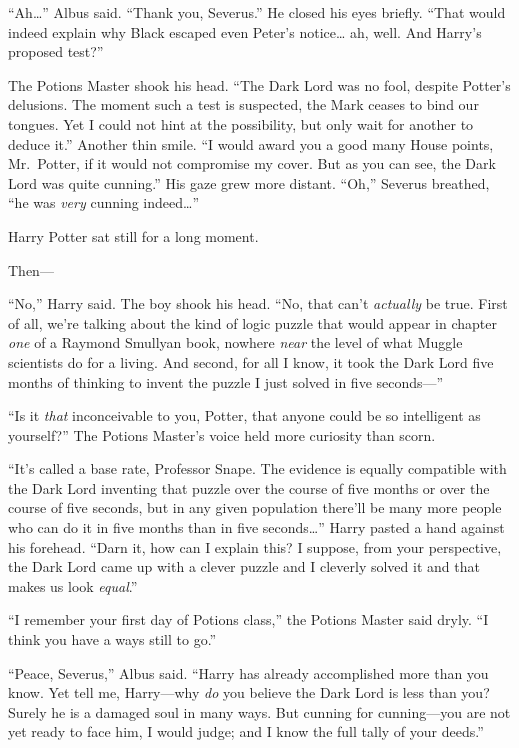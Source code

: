 ``Ah\ldots{}'' Albus said. ``Thank you, Severus.'' He closed his eyes
briefly. ``That would indeed explain why Black escaped even Peter's
notice\ldots{} ah, well. And Harry's proposed test?''

The Potions Master shook his head. ``The Dark Lord was no fool, despite
Potter's delusions. The moment such a test is suspected, the Mark ceases
to bind our tongues. Yet I could not hint at the possibility, but only
wait for another to deduce it.'' Another thin smile. ``I would award you
a good many House points, Mr.~Potter, if it would not compromise my
cover. But as you can see, the Dark Lord was quite cunning.'' His gaze
grew more distant. ``Oh,'' Severus breathed, ``he was \emph{very}
cunning indeed\ldots{}''

Harry Potter sat still for a long moment.

Then---

``No,'' Harry said. The boy shook his head. ``No, that can't
\emph{actually} be true. First of all, we're talking about the kind of
logic puzzle that would appear in chapter \emph{one} of a Raymond
Smullyan book, nowhere \emph{near} the level of what Muggle scientists
do for a living. And second, for all I know, it took the Dark Lord five
months of thinking to invent the puzzle I just solved in five
seconds---''

``Is it \emph{that} inconceivable to you, Potter, that anyone could be
so intelligent as yourself?'' The Potions Master's voice held more
curiosity than scorn.

``It's called a base rate, Professor Snape. The evidence is equally
compatible with the Dark Lord inventing that puzzle over the course of
five months or over the course of five seconds, but in any given
population there'll be many more people who can do it in five months
than in five seconds\ldots{}'' Harry pasted a hand against his forehead.
``Darn it, how can I explain this? I suppose, from your perspective, the
Dark Lord came up with a clever puzzle and I cleverly solved it and that
makes us look \emph{equal}.''

``I remember your first day of Potions class,'' the Potions Master said
dryly. ``I think you have a ways still to go.''

``Peace, Severus,'' Albus said. ``Harry has already accomplished more
than you know. Yet tell me, Harry---why \emph{do} you believe the Dark
Lord is less than you? Surely he is a damaged soul in many ways. But
cunning for cunning---you are not yet ready to face him, I would judge;
and I know the full tally of your deeds.''

